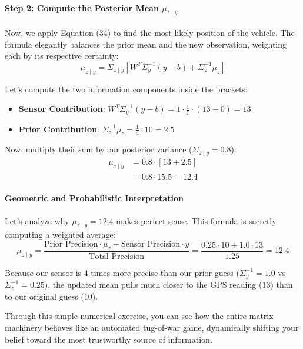 \documentclass{article}
\begin{document}
\paragraph{Step 2: Compute the Posterior Mean $\mu_{z \mid y}$}
Now, we apply Equation (34) to find the most likely position of the vehicle. The formula elegantly balances the prior mean and the new observation, weighting each by its respective certainty:
\begin{equation*}
\mu_{z \mid y} = \Sigma_{z \mid y} \left[ W^T \Sigma_y^{-1}(y - b) + \Sigma_z^{-1}\mu_z \right]
\end{equation*}

Let's compute the two information components inside the brackets:
\begin{itemize}
    \item \textbf{Sensor Contribution}: $W^T \Sigma_y^{-1}(y - b) = 1 \cdot \frac{1}{1} \cdot (13 - 0) = 13$
    \item \textbf{Prior Contribution}: $\Sigma_z^{-1}\mu_z = \frac{1}{4} \cdot 10 = 2.5$
\end{itemize}

Now, multiply their sum by our posterior variance ($\Sigma_{z \mid y} = 0.8$):
\begin{align}
\mu_{z \mid y} &= 0.8 \cdot \left[ 13 + 2.5 \right] \nonumber \\
&= 0.8 \cdot 15.5 = 12.4 \tag{36}
\end{align}

\paragraph{Geometric and Probabilistic Interpretation}
Let's analyze why $\mu_{z \mid y} = 12.4$ makes perfect sense. This formula is secretly computing a weighted average:
\begin{equation*}
\mu_{z \mid y} = \frac{\text{Prior Precision} \cdot \mu_z + \text{Sensor Precision} \cdot y}{\text{Total Precision}} = \frac{0.25 \cdot 10 + 1.0 \cdot 13}{1.25} = 12.4
\end{equation*}

Because our sensor is 4 times more precise than our prior guess ($\Sigma_y^{-1} = 1.0$ vs $\Sigma_z^{-1} = 0.25$), the updated mean pulls much closer to the GPS reading ($13$) than to our original guess ($10$). 

Through this simple numerical exercise, you can see how the entire matrix machinery behaves like an automated tug-of-war game, dynamically shifting your belief toward the most trustworthy source of information.
\end{document}
